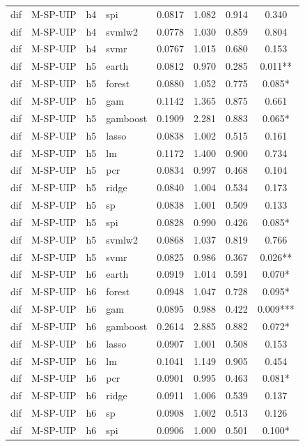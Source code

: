 \begin{ThreePartTable}
\begin{longtable}[t]{llclcccc}
dif & M-SP-UIP & h4 & spi & 0.0817 & 1.082 & 0.914 & 0.340\\
dif & M-SP-UIP & h4 & svmlw2 & 0.0778 & 1.030 & 0.859 & 0.804\\
dif & M-SP-UIP & h4 & svmr & 0.0767 & 1.015 & 0.680 & 0.153\\
\addlinespace
dif & M-SP-UIP & h5 & earth & 0.0812 & 0.970 & 0.285 & 0.011**\\
dif & M-SP-UIP & h5 & forest & 0.0880 & 1.052 & 0.775 & 0.085*\\
dif & M-SP-UIP & h5 & gam & 0.1142 & 1.365 & 0.875 & 0.661\\
dif & M-SP-UIP & h5 & gamboost & 0.1909 & 2.281 & 0.883 & 0.065*\\
dif & M-SP-UIP & h5 & lasso & 0.0838 & 1.002 & 0.515 & 0.161\\
dif & M-SP-UIP & h5 & lm & 0.1172 & 1.400 & 0.900 & 0.734\\
dif & M-SP-UIP & h5 & pcr & 0.0834 & 0.997 & 0.468 & 0.104\\
dif & M-SP-UIP & h5 & ridge & 0.0840 & 1.004 & 0.534 & 0.173\\
dif & M-SP-UIP & h5 & sp & 0.0838 & 1.001 & 0.509 & 0.133\\
dif & M-SP-UIP & h5 & spi & 0.0828 & 0.990 & 0.426 & 0.085*\\
dif & M-SP-UIP & h5 & svmlw2 & 0.0868 & 1.037 & 0.819 & 0.766\\
dif & M-SP-UIP & h5 & svmr & 0.0825 & 0.986 & 0.367 & 0.026**\\
\addlinespace
dif & M-SP-UIP & h6 & earth & 0.0919 & 1.014 & 0.591 & 0.070*\\
dif & M-SP-UIP & h6 & forest & 0.0948 & 1.047 & 0.728 & 0.095*\\
dif & M-SP-UIP & h6 & gam & 0.0895 & 0.988 & 0.422 & 0.009***\\
dif & M-SP-UIP & h6 & gamboost & 0.2614 & 2.885 & 0.882 & 0.072*\\
dif & M-SP-UIP & h6 & lasso & 0.0907 & 1.001 & 0.508 & 0.153\\
dif & M-SP-UIP & h6 & lm & 0.1041 & 1.149 & 0.905 & 0.454\\
dif & M-SP-UIP & h6 & pcr & 0.0901 & 0.995 & 0.463 & 0.081*\\
dif & M-SP-UIP & h6 & ridge & 0.0911 & 1.006 & 0.539 & 0.137\\
dif & M-SP-UIP & h6 & sp & 0.0908 & 1.002 & 0.513 & 0.126\\
dif & M-SP-UIP & h6 & spi & 0.0906 & 1.000 & 0.501 & 0.100*\\

\end{longtable}
\end{ThreePartTable}
